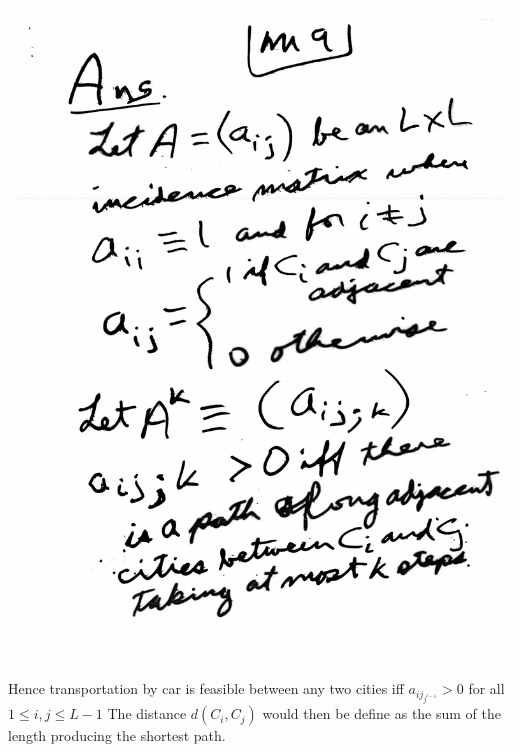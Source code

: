\documentclass[10pt,a4paper]{article}
\begin{document}
\includegraphics[scale=.5]{Pages/MS_9}


\newpage

Hence transportation by car is feasible between any two cities iff $a_{ij_{j^{l-1}}} > 0$ for all $1 \leq i,j \leq L-1$ The distance $d(C_i, C_j)$ would then be define as the sum of the length producing the shortest path. 
\end{document}
